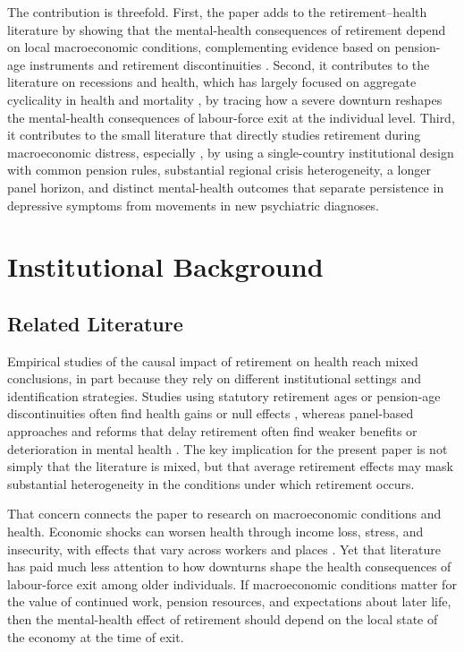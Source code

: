 \documentclass[arguments, manuscript, 11pt]{aastex631}
\begin{document}
The contribution is threefold. First, the paper adds to the retirement--health literature by showing that the mental-health consequences of retirement depend on local macroeconomic conditions, complementing evidence based on pension-age instruments and retirement discontinuities \citep{bonsang2012retirement, eibich2015understanding, rose2020retirement, carrino2020later, ebeid2023short}. Second, it contributes to the literature on recessions and health, which has largely focused on aggregate cyclicality in health and mortality \citep{ruhm2000recessions, ruhm2015recessions, mcinerney2012recessions, modrek2013review}, by tracing how a severe downturn reshapes the mental-health consequences of labour-force exit at the individual level. Third, it contributes to the small literature that directly studies retirement during macroeconomic distress, especially \cite{belloni2016effect}, by using a single-country institutional design with common pension rules, substantial regional crisis heterogeneity, a longer panel horizon, and distinct mental-health outcomes that separate persistence in depressive symptoms from movements in new psychiatric diagnoses.


\section{Institutional Background} \label{sec:background}
\subsection{Related Literature} \label{sec:literature}
Empirical studies of the causal impact of retirement on health reach mixed conclusions, in part because they rely on different institutional settings and identification strategies. Studies using statutory retirement ages or pension-age discontinuities often find health gains or null effects \citep{bound2007estimating, neuman2008quit, bonsang2012retirement, eibich2015understanding, rose2020retirement}, whereas panel-based approaches and reforms that delay retirement often find weaker benefits or deterioration in mental health \citep{dave2006effects, bamia2007age, ebeid2023short, carrino2020later}. The key implication for the present paper is not simply that the literature is mixed, but that average retirement effects may mask substantial heterogeneity in the conditions under which retirement occurs.

That concern connects the paper to research on macroeconomic conditions and health. Economic shocks can worsen health through income loss, stress, and insecurity, with effects that vary across workers and places \citep{eliason2009does, sullivan2009job, mcinerney2012recessions, jofre2018impact, black2022whose}. Yet that literature has paid much less attention to how downturns shape the health consequences of labour-force exit among older individuals. If macroeconomic conditions matter for the value of continued work, pension resources, and expectations about later life, then the mental-health effect of retirement should depend on the local state of the economy at the time of exit.
\end{document}
